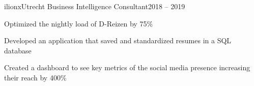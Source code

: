 \resumeSubheading
  {ilionx}{Utrecht}
  {Business Intelligence Consultant}{2018 – 2019}
  \vspace{-2.0mm}
  \resumeItemListStart
\item Optimized the nightly load of D-Reizen by 75\%
\item Developed an application that saved and standardized resumes in a SQL database
\item Created a dashboard to see key metrics of the social media presence increasing their reach by 400\%
  \resumeItemListEnd 